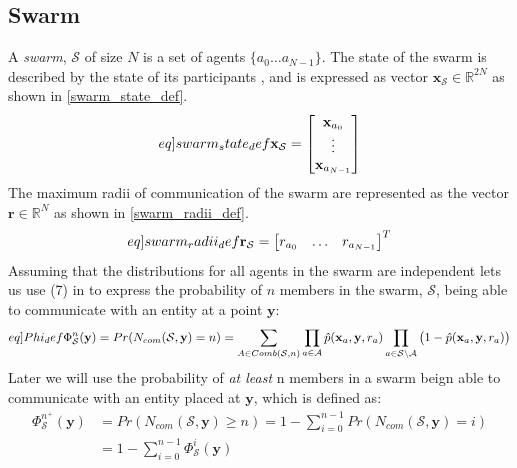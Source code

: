 \subsection{Swarm}
A \textit{swarm}, $\mathcal{S}$ of size $N$ is a set of agents $\{a_{0}\hdots a_{N-1}\}$. The state of the swarm is described by the state of its participants 
, and is expressed as vector $\mathbf{x}_{\mathcal{S}}\in\mathbb{R}^{2N}$ as shown in \eqref{swarm_state_def}.
\begin{equation}\label[eq]{swarm_state_def}
  \mathbf{x}_{\mathcal{S}} = \begin{bmatrix}
    \mathbf{x}_{a_{0}}\\\vdots\\\mathbf{x}_{a_{N-1}}
  \end{bmatrix}
\end{equation}
The maximum radii of communication of the swarm are represented as the vector $\mathbf{r}\in\mathbb{R}^{N}$ as shown in \eqref{swarm_radii_def}.
\begin{equation}\label[eq]{swarm_radii_def}
  \mathbf{r}_{\mathcal{S}} = \begin{bmatrix}
    r_{a_{0}}&\hdots&r_{a_{N-1}}
  \end{bmatrix}^{T}
\end{equation}
Assuming that the distributions for all agents in the swarm are independent lets us use (7) in \cite{10.2307/24304959} to express 
the probability of $n$ members in the swarm, $\mathcal{S}$, being able to communicate with an entity at a point $\mathbf{y}$:
\begin{equation}\label[eq]{Phi_def}
  \Phi^{n}_{\mathcal{S}}(\mathbf{y}) = Pr(N_{com}(\mathcal{S}, \mathbf{y}) = n) = \sum_{A\in Comb(\mathcal{S}, n)}\prod_{a\in\mathcal{A}}\hat{p}(\mathbf{x}_{a}, \mathbf{y}, r_{a})\prod_{a\in\mathcal{S}\setminus\mathcal{A}}\big(1-\hat{p}(\mathbf{x}_{a}, \mathbf{y}, r_{a})\big)
\end{equation}
Later we will use the probability of \textit{at least} n members in a swarm beign able to communicate with an entity placed at $\mathbf{y}$, which is defined as:
\begin{equation}
  \begin{split}
    \Phi^{n^{+}}_{\mathcal{S}}(\mathbf{y}) &= Pr(N_{com}(\mathcal{S}, \mathbf{y}) \geq n) = 1 - \sum_{i=0}^{n-1}Pr(N_{com}(\mathcal{S}, \mathbf{y}) = i)\\
    &= 1 - \sum_{i=0}^{n-1}\Phi^{i}_{\mathcal{S}}(\mathbf{y})
  \end{split}
\end{equation}